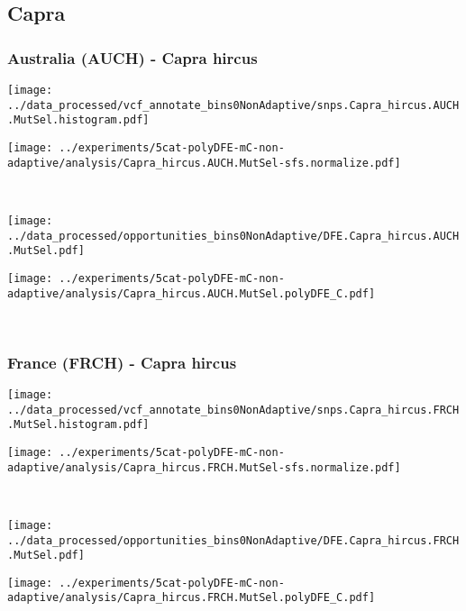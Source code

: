 \subsection{Capra}

\subsubsection{Australia (AUCH) - Capra hircus}

\begin{minipage}{0.49\linewidth}
    \texttt{[image: ../data\_processed/vcf\_annotate\_bins0NonAdaptive/snps.Capra\_hircus.AUCH.MutSel.histogram.pdf]}
\end{minipage}
\begin{minipage}{0.49\linewidth}
    \texttt{[image: ../experiments/5cat-polyDFE-mC-non-adaptive/analysis/Capra\_hircus.AUCH.MutSel-sfs.normalize.pdf]}
\end{minipage}
\\
\begin{minipage}{0.49\linewidth}
    \texttt{[image: ../data\_processed/opportunities\_bins0NonAdaptive/DFE.Capra\_hircus.AUCH.MutSel.pdf]}
\end{minipage}
\begin{minipage}{0.49\linewidth}
    \texttt{[image: ../experiments/5cat-polyDFE-mC-non-adaptive/analysis/Capra\_hircus.AUCH.MutSel.polyDFE\_C.pdf]}
\end{minipage}
\\

\subsubsection{France (FRCH) - Capra hircus}

\begin{minipage}{0.49\linewidth}
    \texttt{[image: ../data\_processed/vcf\_annotate\_bins0NonAdaptive/snps.Capra\_hircus.FRCH.MutSel.histogram.pdf]}
\end{minipage}
\begin{minipage}{0.49\linewidth}
    \texttt{[image: ../experiments/5cat-polyDFE-mC-non-adaptive/analysis/Capra\_hircus.FRCH.MutSel-sfs.normalize.pdf]}
\end{minipage}
\\
\begin{minipage}{0.49\linewidth}
    \texttt{[image: ../data\_processed/opportunities\_bins0NonAdaptive/DFE.Capra\_hircus.FRCH.MutSel.pdf]}
\end{minipage}
\begin{minipage}{0.49\linewidth}
    \texttt{[image: ../experiments/5cat-polyDFE-mC-non-adaptive/analysis/Capra\_hircus.FRCH.MutSel.polyDFE\_C.pdf]}
\end{minipage}
\\

